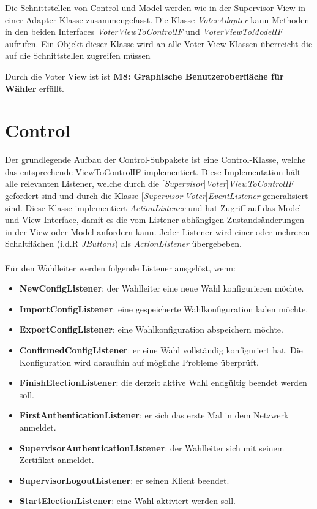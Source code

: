 \documentclass[parskip=full]{scrartcl}
\newcommand{\textitx}[1]{\mbox{\textit{#1}}}
\newcommand{\fakeparagraph}[1]{\textbf{#1}}
\begin{document}
		Die Schnittstellen von Control und Model werden wie in der Supervisor View in einer Adapter Klasse zusammengefasst. Die Klasse \textitx{VoterAdapter} kann Methoden in den beiden Interfaces \textit{VoterViewToControlIF} und \textit{VoterViewToModelIF} aufrufen. Ein Objekt dieser Klasse wird an alle Voter View Klassen überreicht die auf die Schnittstellen zugreifen müssen
		
		Durch die Voter View ist ist \textbf{M8: Graphische Benutzeroberfläche für Wähler} erfüllt.
	\newpage

	\section{Control}
	Der grundlegende Aufbau der Control-Subpakete ist eine Control-Klasse, welche das entsprechende ViewToControlIF implementiert. Diese Implementation hält alle relevanten Listener, welche durch die [\textitx{Supervisor}|\textitx{Voter}]\textitx{ViewToControlIF} gefordert sind und durch die Klasse [\textitx{Supervisor}|\textitx{Voter}]\textitx{EventListener} generalisiert sind. Diese Klasse implementiert \textitx{ActionListener} und hat Zugriff auf das Model- und View-Interface, damit es die vom Listener abhängigen Zustandsänderungen in der View oder Model anfordern kann. Jeder Listener wird einer oder mehreren Schaltflächen (i.d.R \textitx{JButtons}) als \textitx{ActionListener} übergebeben.\\
	\\
	Für den Wahlleiter werden folgende Listener ausgelöst, wenn:
	\begin{itemize}
		\item\fakeparagraph{NewConfigListener}: der Wahlleiter eine neue Wahl konfigurieren möchte.
		\item\fakeparagraph{ImportConfigListener}: eine gespeicherte Wahlkonfiguration laden möchte.
		\item\fakeparagraph{ExportConfigListener}: eine Wahlkonfiguration abspeichern möchte.
		\item\fakeparagraph{ConfirmedConfigListener}: er eine Wahl vollständig konfiguriert hat. Die Konfiguration wird daraufhin auf mögliche Probleme überprüft.
		\item\fakeparagraph{FinishElectionListener}: die derzeit aktive Wahl endgültig beendet werden soll. 
		\item\fakeparagraph{FirstAuthenticationListener}: er sich das erste Mal in dem Netzwerk anmeldet.
		\item\fakeparagraph{SupervisorAuthenticationListener}: der Wahlleiter sich mit seinem Zertifikat anmeldet.
		\item\fakeparagraph{SupervisorLogoutListener}: er seinen Klient beendet.
		\item\fakeparagraph{StartElectionListener}: eine Wahl aktiviert werden soll.
	\end{itemize}
	
\end{document}
